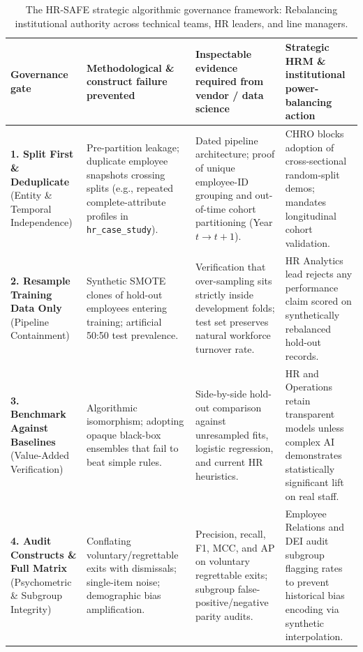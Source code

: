 \documentclass[12pt,a4paper]{article}
\begin{document}
\begin{table}[p]
\centering\singlespacing\footnotesize\setlength{\tabcolsep}{3.5pt}
\caption{The HR-SAFE strategic algorithmic governance framework: Rebalancing institutional authority across technical teams, HR leaders, and line managers.}
\label{tab:8}
\begin{tabularx}{\textwidth}{@{}p{}p{}p{}X@{}}
\toprule
\textbf{Governance gate} & \textbf{Methodological \& construct failure prevented} & \textbf{Inspectable evidence required from vendor / data science} & \textbf{Strategic HRM \& institutional power-balancing action} \\
\midrule
\textbf{1. Split First \& Deduplicate} \newline (Entity \& Temporal Independence) & Pre-partition leakage; duplicate employee snapshots crossing splits (e.g., repeated complete-attribute profiles in \texttt{hr\_case\_study}). & Dated pipeline architecture; proof of unique employee-ID grouping and out-of-time cohort partitioning (Year $t \rightarrow t+1$). & CHRO blocks adoption of cross-sectional random-split demos; mandates longitudinal cohort validation. \\
\addlinespace[4pt]
\textbf{2. Resample Training Data Only} \newline (Pipeline Containment) & Synthetic SMOTE clones of hold-out employees entering training; artificial 50:50 test prevalence. & Verification that over-sampling sits strictly inside development folds; test set preserves natural workforce turnover rate. & HR Analytics lead rejects any performance claim scored on synthetically rebalanced hold-out records. \\
\addlinespace[4pt]
\textbf{3. Benchmark Against Baselines} \newline (Value-Added Verification) & Algorithmic isomorphism; adopting opaque black-box ensembles that fail to beat simple rules. & Side-by-side hold-out comparison against unresampled fits, logistic regression, and current HR heuristics. & HR and Operations retain transparent models unless complex AI demonstrates statistically significant lift on real staff. \\
\addlinespace[4pt]
\textbf{4. Audit Constructs \& Full Matrix} \newline (Psychometric \& Subgroup Integrity) & Conflating voluntary/regrettable exits with dismissals; single-item noise; demographic bias amplification. & Precision, recall, F1, MCC, and AP on voluntary regrettable exits; subgroup false-positive/negative parity audits. & Employee Relations and DEI audit subgroup flagging rates to prevent historical bias encoding via synthetic interpolation. \\

\end{tabularx}
\end{table}
\end{document}
